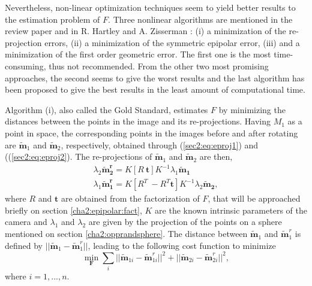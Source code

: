 Nevertheless, non-linear optimization techniques seem to yield better results to the estimation problem of $F$. Three nonlinear algorithms are mentioned in the review paper \cite{detep} and in R. Hartley and A. Zisserman \cite{multiview}: (i) a minimization of the re-projection errors, (ii) a minimization of the symmetric epipolar error, (iii) and a minimization of the first order geometric error. The first one is the most time-consuming, thus not recommended. From the other two most promising approaches, the second seems to give the worst results and the last algorithm has been proposed to give the best results in the least amount of computational time. 

Algorithm (i), also called the Gold Standard, estimates $F$ by minimizing the distances between the points in the image and its re-projections. Having $M_1$ as a point in space, the corresponding points in the images before and after rotating are $\widetilde{\mathbf{m}}_{1}$ and $\widetilde{\mathbf{m}}_{2}$, respectively, obtained through  (\ref{sec2:eq:eproj1}) and ((\ref{sec2:eq:eproj2}).
The re-projections of $\widetilde{\mathbf{m}}_{1}$ and $\widetilde{\mathbf{m}}_{2}$ are then, 
\begin{align}
\label{cha2:epipolar:shitshit1}
	\lambda_2 \mathbf{\tilde{m}^r_2} = K [ R \ \mathbf{t} ] K^{-1} \lambda_1 \mathbf{\tilde{m}_1}\\
\label{cha2:epipolar:shitshit2}
	\lambda_1 \mathbf{\tilde{m}^r_1} =  K [ R^{T} \ -R^{T}\mathbf{t} ] K^{-1}  \lambda_2 \mathbf{\tilde{m}_2},
\end{align}
where $R$ and $\mathbf{t}$ are obtained from the factorization of $F$, that will be approached briefly on section \ref{cha2:epipolar:fact}, $K$ are the known intrinsic parameters of the camera and $\lambda_1$ and $\lambda_2$ are given by the projection of the points on a sphere mentioned on section \ref{cha2:opprandsphere}. The distance between $\widetilde{\mathbf{m}}_{1}$ and $\widetilde{\mathbf{m}}^r_{1}$ is defined by $|| \widetilde{\mathbf{m}}_{1} - \widetilde{\mathbf{m}}^r_{1} ||$, leading to the following cost function to minimize 
\begin{equation}
\label{cha2:sec3:eq:gold}
	\min_{\mathbf{F}} \sum_{i}
	||\widetilde{\mathbf{m}}_{1i} - \widetilde{\mathbf{m}}^r_{1i}||^2
	+
	||\widetilde{\mathbf{m}}_{2i} - \widetilde{\mathbf{m}}^r_{2i}||^2,
\end{equation}
where $i=1,...,n$.

